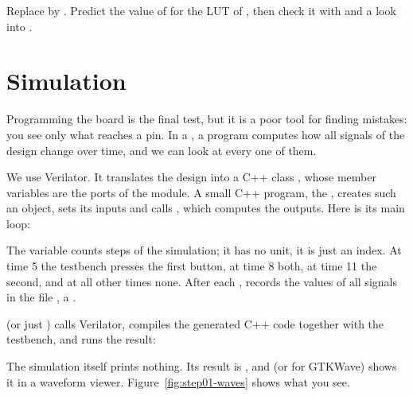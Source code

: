 \begin{exercise}
\label{ex:step01-xor}
Replace  by . Predict the value of
 for the LUT of , then check it with 
and a look into .
\end{exercise}

\section{Simulation}
\label{sec:step01-sim}

Programming the board is the final test, but it is a poor tool for finding
mistakes: you see only what reaches a pin. In a , a program
computes how all signals of the design change over time, and we can look at
every one of them.

We use Verilator. It translates the design into a C++ class , whose
member variables are the ports of the module. A small C++ program, the
 , creates such an object, sets its inputs and
calls , which computes the outputs. Here is its main loop:


The variable  counts steps of the simulation; it has no unit, it is
just an index. At time 5 the testbench presses the first button, at time 8
both, at time 11 the second, and at all other times none. After each
,  records the values of all signals in
the file , a .

 (or just ) calls Verilator, compiles the generated C++
code together with the testbench, and runs the result:


The simulation itself prints nothing. Its result is , and
 (or  for GTKWave) shows it in a waveform
viewer. Figure~\ref{fig:step01-waves} shows what you see.

